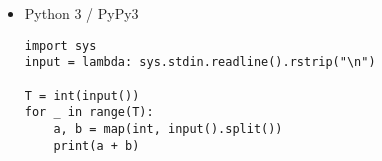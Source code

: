 \begin{itemize}[noitemsep]
\begin{itemize}[noitemsep]
\begin{verbatim}
public class Main{
    public static void main(String[] args) throws IOException {
        BufferedReader br = new BufferedReader(new InputStreamReader(System.in));
        BufferedWriter bw = new BufferedWriter(new OutputStreamWriter(System.out));

        int T = Integer.parseInt(br.readLine());
        for(int i=1; i<=T; i++){
            String[] temp = br.readLine().split(" ");
            int a = Integer.parseInt(temp[0]);
            int b = Integer.parseInt(temp[1]);
            bw.write(String.valueOf(a + b) + "\n");
        }
        br.close();
        bw.close();
    }
}
        \end{verbatim}
        
        \item Python 3 / PyPy3
        \begin{verbatim}
import sys
input = lambda: sys.stdin.readline().rstrip("\n")

T = int(input())
for _ in range(T):
    a, b = map(int, input().split())
    print(a + b)
        \end{verbatim}
        
    \end{itemize}
	
\end{itemize}